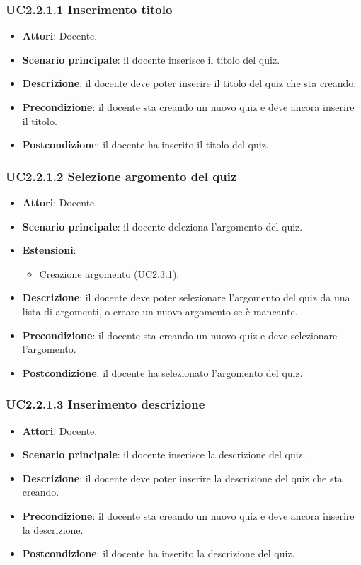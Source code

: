 \subsubsection{UC2.2.1.1 Inserimento titolo}
\begin{itemize}
\item \textbf{Attori}: Docente.
\item \textbf{Scenario principale}: il docente inserisce il titolo del quiz.
\item \textbf{Descrizione}: il docente deve poter inserire il titolo del quiz che sta creando.
\item \textbf{Precondizione}: il docente sta creando un nuovo quiz e deve ancora inserire il titolo.
\item \textbf{Postcondizione}: il docente ha inserito il titolo del quiz.
\end{itemize}
\subsubsection{UC2.2.1.2 Selezione argomento del quiz}
\begin{itemize}
\item \textbf{Attori}: Docente.
\item \textbf{Scenario principale}: il docente deleziona l'argomento del quiz.
\item \textbf{Estensioni}:
\begin{itemize}
\item Creazione argomento (UC2.3.1).
\end{itemize}
\item \textbf{Descrizione}: il docente deve poter selezionare l'argomento del quiz da una lista di argomenti, o creare un nuovo argomento se è mancante.
\item \textbf{Precondizione}: il docente sta creando un nuovo quiz e deve selezionare l'argomento.
\item \textbf{Postcondizione}: il docente ha selezionato l'argomento del quiz.
\end{itemize}
\subsubsection{UC2.2.1.3 Inserimento descrizione}
\begin{itemize}
\item \textbf{Attori}: Docente.
\item \textbf{Scenario principale}: il docente inserisce la descrizione del quiz.
\item \textbf{Descrizione}: il docente deve poter inserire la descrizione del quiz che sta creando.
\item \textbf{Precondizione}: il docente sta creando un nuovo quiz e deve ancora inserire la descrizione.
\item \textbf{Postcondizione}: il docente ha inserito la descrizione del quiz.
\end{itemize}
